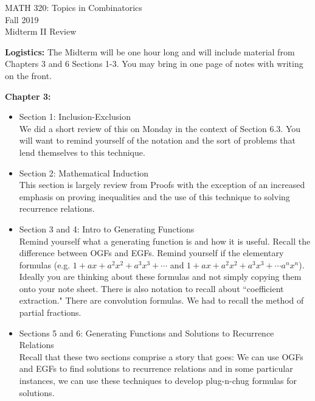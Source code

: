 \documentclass[11pt]{article}
\begin{document}
\begin{center}MATH 320: Topics in Combinatorics  \\ Fall 2019 \\ Midterm II Review\end{center}

\hrulefill

\noindent\textbf{Logistics:} The Midterm will be one hour long and will include material from Chapters 3 and 6 Sections 1-3. You may bring in one page of notes with writing on the front. \\

\hrulefill

\noindent\textbf{Chapter 3:} 

\begin{itemize}
\item Section 1: Inclusion-Exclusion\\
We did a short review of this on Monday in the context of Section 6.3. You will want to remind yourself of the notation and the sort of problems that lend themselves to this technique.\\
\item Section 2: Mathematical Induction\\
This section is largely review from Proofs with the exception of an increased emphasis on proving inequalities and the use of this technique to solving recurrence relations.\\
\item Section 3 and 4: Intro to Generating Functions\\
Remind yourself what a generating function is and how it is useful. Recall the difference between OGFs and EGFs. Remind yourself if the elementary formulas (e.g. $1+ax+a^2x^2 + a^3x^3+ \cdots$ and  $1+ax+a^2 x^2 + a^3x^3+ \cdots a^nx^n$). Ideally you are thinking about these formulas and not simply copying them onto your note sheet. There is also notation to recall about ``coefficient extraction." There are convolution formulas. We had to recall the method of partial fractions.\\
\item Sections 5 and 6: Generating Functions and Solutions to Recurrence Relations\\
Recall that these two sections comprise a story that goes: We can use OGFs and EGFs to find solutions to recurrence relations and in some particular instances, we can use these techniques to develop plug-n-chug formulas for solutions.\\
\end{itemize}
\end{document}
